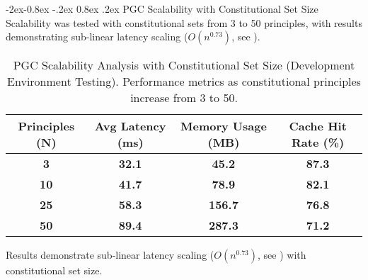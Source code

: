 \documentclass[manuscript,screen,9pt]{acmart}
\makeatletter
\renewcommand\subsubsection{\@startsection{subsubsection}{3}{\z@}%
  {-2ex\@plus -0.8ex \@minus -.2ex}%
  {0.8ex \@plus .2ex}%
  {\normalfont\normalsize\bfseries}}
\newcommand{\tablesize}{\footnotesize}
\newcommand{\tablenumfmt}[1]{\textbf{#1}}
\newcommand{\tableheader}[1]{\textbf{#1}}
\makeatother
\begin{document}
\begin{table}[!htb]
\subsubsection{PGC Scalability with Constitutional Set Size}
Scalability was tested with constitutional sets from 3 to 50 principles, with results demonstrating sub-linear latency scaling ($O(n^{0.73})$, see ).
\begin{table}[htbp]
\centering
\caption{PGC Scalability Analysis with Constitutional Set Size (Development Environment Testing). Performance metrics as constitutional principles increase from 3 to 50.}
\label{tab:pgc_scalability}
\tablesize
\begin{tabular}{@{}cccc@{}}
\toprule
\tableheader{Principles (N)} & \tableheader{Avg Latency (ms)} & \tableheader{Memory Usage (MB)} & \tableheader{Cache Hit Rate (\%)} \\
\midrule
\tablenumfmt{3}   & \tablenumfmt{32.1}  & \tablenumfmt{45.2}  & \tablenumfmt{87.3} \\
\tablenumfmt{10}  & \tablenumfmt{41.7}  & \tablenumfmt{78.9}  & \tablenumfmt{82.1} \\
\tablenumfmt{25}  & \tablenumfmt{58.3}  & \tablenumfmt{156.7} & \tablenumfmt{76.8} \\
\tablenumfmt{50}  & \tablenumfmt{89.4}  & \tablenumfmt{287.3} & \tablenumfmt{71.2} \\
\bottomrule
\end{tabular}
\end{table}
Results demonstrate sub-linear latency scaling ($O(n^{0.73})$, see ) with constitutional set size.


\end{table}
\end{document}
